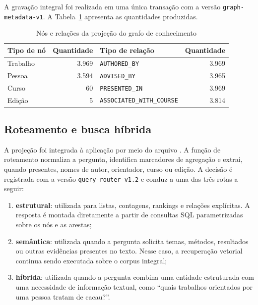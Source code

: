 A gravação integral foi realizada em uma única transação com a versão \texttt{graph-metadata-v1}. A Tabela~\ref{tab:grafo-contagens} apresenta as quantidades produzidas.

\begin{table}[htbp]
\centering
\caption{Nós e relações da projeção do grafo de conhecimento}
\label{tab:grafo-contagens}
\renewcommand{\arraystretch}{1.18}
\small
\begin{tabular*}{\textwidth}{@{\extracolsep{\fill}}lrlr}
\toprule
\textbf{Tipo de nó} & \textbf{Quantidade} & \textbf{Tipo de relação} & \textbf{Quantidade} \\ \midrule
Trabalho & 3.969 & \texttt{AUTHORED\_BY} & 3.969 \\
Pessoa & 3.594 & \texttt{ADVISED\_BY} & 3.965 \\
Curso & 60 & \texttt{PRESENTED\_IN} & 3.969 \\
Edição & 5 & \texttt{ASSOCIATED\_WITH\_COURSE} & 3.814 \\ \bottomrule
\end{tabular*}
\end{table}

\subsection{Roteamento e busca híbrida}

A projeção foi integrada à aplicação por meio do arquivo . A função de roteamento normaliza a pergunta, identifica marcadores de agregação e extrai, quando presentes, nomes de autor, orientador, curso ou edição. A decisão é registrada com a versão \texttt{query-router-v1.2} e conduz a uma das três rotas a seguir:

\begin{enumerate}
    \item \textbf{estrutural}: utilizada para listas, contagens, rankings e relações explícitas. A resposta é montada diretamente a partir de consultas SQL parametrizadas sobre os nós e as arestas;
    \item \textbf{semântica}: utilizada quando a pergunta solicita temas, métodos, resultados ou outras evidências presentes no texto. Nesse caso, a recuperação vetorial continua sendo executada sobre o corpus integral;
    \item \textbf{híbrida}: utilizada quando a pergunta combina uma entidade estruturada com uma necessidade de informação textual, como ``quais trabalhos orientados por uma pessoa tratam de cacau?''.
\end{enumerate}

